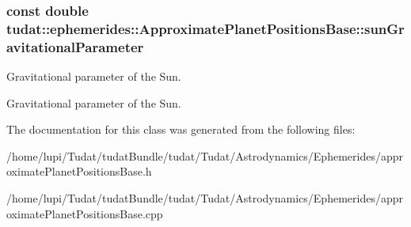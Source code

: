 \subsubsection[{\texorpdfstring{sun\+Gravitational\+Parameter}{sunGravitationalParameter}}]{\setlength{\rightskip}{0pt plus 5cm}const double tudat\+::ephemerides\+::\+Approximate\+Planet\+Positions\+Base\+::sun\+Gravitational\+Parameter\hspace{0.3cm}{\ttfamily [protected]}}\hypertarget{classtudat_1_1ephemerides_1_1ApproximatePlanetPositionsBase_a58b16732dcf7b19bda3810b455aca6bf}{}\label{classtudat_1_1ephemerides_1_1ApproximatePlanetPositionsBase_a58b16732dcf7b19bda3810b455aca6bf}


Gravitational parameter of the Sun. 

Gravitational parameter of the Sun. 

The documentation for this class was generated from the following files\+:\begin{DoxyCompactItemize}
\item 
/home/lupi/\+Tudat/tudat\+Bundle/tudat/\+Tudat/\+Astrodynamics/\+Ephemerides/approximate\+Planet\+Positions\+Base.\+h\item 
/home/lupi/\+Tudat/tudat\+Bundle/tudat/\+Tudat/\+Astrodynamics/\+Ephemerides/approximate\+Planet\+Positions\+Base.\+cpp\end{DoxyCompactItemize}
